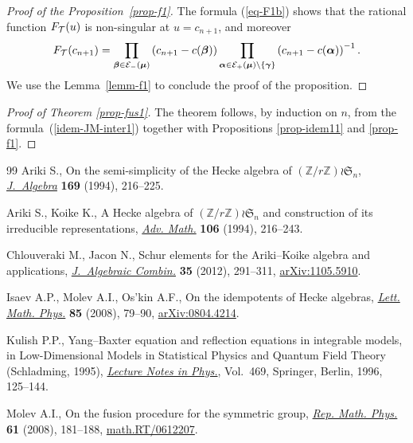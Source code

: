 \documentclass[11pt]{article}
\newcommand{\mum}{\boldsymbol{\mu}}
\newcommand{\alm}{\boldsymbol{\alpha}}
\newcommand{\bem}{\boldsymbol{\beta}}
\newcommand{\gam}{\boldsymbol{\gamma}}
\begin{document}
\begin{proof}[Proof of the Proposition~\ref{prop-f1}] The formula (\ref{eq-F1b}) shows that the rational function $F_{{\cal{T}}}(u)$ is non-singular at $u=c_{n+1}$, and moreover
\begin{gather*}
F_{{\cal{T}}}(c_{n+1})= \prod_{\bem\in {\cal{E}}_-(\mum)}\left(c_{n+1}-c(\bem)\right)\prod_{\alm\in {\cal{E}}_+(\mum)\backslash\{\gam\}}\left(c_{n+1}-c(\alm)\right)^{-1} .
\end{gather*}
We use the Lemma~\ref{lemm-f1} to conclude the proof of the proposition.
\end{proof}


\begin{proof}[Proof of Theorem  \ref{prop-fus1}]
 The theorem follows, by induction on $n$, from the formula~(\ref{idem-JM-inter1}) together with Propositions \ref{prop-idem11} and \ref{prop-f1}.
\end{proof}
\begin{thebibliography}{99}
Ariki S., On the semi-simplicity of the {H}ecke algebra of
  $(\mathbb{Z}/r\mathbb{Z})\wr {\mathfrak S}_n$, \href{http://dx.doi.org/10.1006/jabr.1994.1280}{\textit{J.~Algebra}}
  \textbf{169} (1994), 216--225.

Ariki S., Koike K., A {H}ecke algebra of $(\mathbb{Z}/r\mathbb{Z})\wr
  {\mathfrak S}_n$ and construction of its irreducible representations,
  \href{http://dx.doi.org/10.1006/aima.1994.1057}{\textit{Adv. Math.}} \textbf{106} (1994), 216--243.

Chlouveraki M., Jacon N., Schur elements for the {A}riki--{K}oike algebra and
  applications, \href{http://dx.doi.org/10.1007/s10801-011-0314-4}{\textit{J.~Algebraic Combin.}} \textbf{35} (2012), 291--311,
  \href{http://arxiv.org/abs/1105.5910}{arXiv:1105.5910}.

Isaev A.P., Molev A.I., Os'kin A.F., On the idempotents of {H}ecke algebras,
  \href{http://dx.doi.org/10.1007/s11005-008-0254-7}{\textit{Lett. Math. Phys.}} \textbf{85} (2008), 79--90, \href{http://arxiv.org/abs/0804.4214}{arXiv:0804.4214}.

Kulish P.P., Yang--{B}axter equation and ref\/lection equations in integrable
  models, in Low-Dimensional Mo\-dels in Statistical Physics and Quantum Field
  Theory ({S}chladming, 1995), \href{http://dx.doi.org/10.1007/BFb0102555}{\textit{Lecture Notes in Phys.}}, Vol.~469,
  Springer, Berlin, 1996, 125--144.

Molev A.I., On the fusion procedure for the symmetric group, \href{http://dx.doi.org/10.1016/S0034-4877(08)80005-5}{\textit{Rep. Math.
  Phys.}} \textbf{61} (2008), 181--188, \href{http://arxiv.org/abs/math.RT/0612207}{math.RT/0612207}.


\end{thebibliography}
\end{document}
